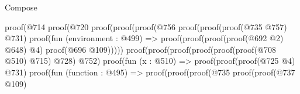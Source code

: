 \begin{lexlean}{Compose}
\begin{coremodule}
                                                                proof(@714
                                                                    proof(@720
                                                                        proof(proof(proof(@756
                                                                                proof(proof(proof(@735
                                                                                        @757)
                                                                                      @731)
                                                                                    proof(fun (environment : @499) =>
                                                                                      proof(proof(proof(proof(@692
                                                                                                @2)
                                                                                              @648)
                                                                                            @4)
                                                                                          proof(@696
                                                                                              @109)))))
                                                                              proof(proof(proof(proof(proof(proof(@708
                                                                                            @510)
                                                                                          @715)
                                                                                        @728)
                                                                                      @752)
                                                                                    proof(fun (x : @510) =>
                                                                                      proof(proof(proof(@725
                                                                                              @4)
                                                                                            @731)
                                                                                          proof(fun (function : @495) =>
                                                                                            proof(proof(proof(@735
                                                                                                    proof(proof(@737
                                                                                                          @109)

\end{coremodule}
\end{lexlean}
